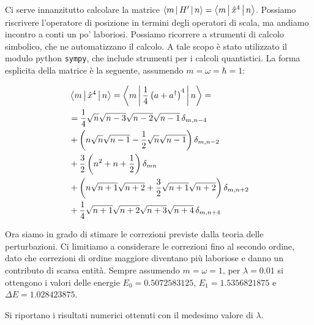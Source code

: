 \documentclass[11pt, a4paper]{article}
\begin{document}
Ci serve innanzitutto calcolare la matrice $\Braket{m | H' | n} = \Braket{m | \hat{x}^4 | n}$. Possiamo riscrivere l'operatore di posizione
in termini degli operatori di scala, ma andiamo incontro a conti un po' laboriosi.
Possiamo ricorrere a strumenti di calcolo simbolico, che ne automatizzano il calcolo. A tale scopo è stato utilizzato il modulo python \texttt{sympy}, che include strumenti per i calcoli quantistici.
La forma esplicita della matrice è la seguente, assumendo $m = \omega = \hbar = 1$:

\begin{equation}
  \begin{split}
    & \Braket{m | \hat{x}^4 | n} = \Braket{m | \frac{1}{4} \left(a + a^\dagger\right)^4 | n} = \\
    & = \frac{1}{4} \sqrt{n} \sqrt{n - 3} \sqrt{n - 2} \sqrt{n - 1}\, \delta_{m, n - 4} \\
    & + \left(n \sqrt{n} \sqrt{n - 1} - \frac{1}{2} \sqrt{n} \sqrt{n - 1}\right) \delta_{m, n - 2} \\
    & + \frac{3}{2} \left(n^{2} + n + \frac{1}{2}\right) \delta_{m n} \\
    & + \left(n \sqrt{n + 1} \sqrt{n + 2} + \frac{3}{2} \sqrt{n + 1} \sqrt{n + 2}\right) \delta_{m, n + 2}  \\
    & + \frac{1}{4} \sqrt{n + 1} \sqrt{n + 2} \sqrt{n + 3} \sqrt{n + 4}\, \delta_{m, n + 4} \\
  \end{split}
\end{equation}


Ora siamo in grado di stimare le correzioni previste dalla teoria delle perturbazioni.
Ci limitiamo a considerare le correzioni fino al secondo ordine, dato che correzioni di ordine maggiore diventano più laboriose e danno un contributo di scarsa entità.
Sempre assumendo $m = \omega = 1$, per $\lambda = 0.01$ si ottengono i valori delle energie $E_0 = 0.5072583125$, $E_1 = 1.5356821875$ e $\Delta E = 1.028423875$.

Si riportano i risultati numerici ottenuti con il medesimo valore di $\lambda$.
\end{document}
